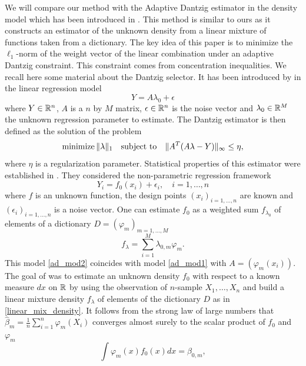 We will compare our method with the Adaptive Dantzig estimator in the density model which has been introduced in \citep{Bertin}. This method is similar to ours as it constructs an estimator of the unknown density from a linear mixture of functions taken from a dictionary. The key idea of this paper is to minimize the $\ell_1$-norm of the weight vector of the linear combination under an adaptive Dantzig constraint. This constraint comes from concentration inequalities. We recall here some material about the Dantzig selector. It has been introduced by \citep{candes2007} in the linear regression model
\begin{equation}
\label{ad_mod1}
	Y = A\lambda_0 + \epsilon
\end{equation}
where $Y\in {\mathbb R}^n$, $A$ is a $n$ by $M$ matrix, $\epsilon \in {\mathbb R}^n$ is the noise vector and $\lambda_0\in {\mathbb R}^M$ the unknown regression parameter to estimate. The Dantzig estimator is then defined as the solution of the problem
\begin{equation}
	 \textnormal{minimize}\,  \|\lambda \|_1 \quad \text{subject to} \quad \| A^T(A\lambda-Y)\|_{\infty} \leq \eta,
\end{equation}
where $\eta$ is a regularization parameter. Statistical properties of this estimator were established in \citep{bickel2009}. They considered the non-parametric regression framework
\begin{equation}
\label{ad_mod2}
		Y_i = f_0(x_i) + \epsilon_i, \quad i=1,\dots,n
\end{equation}
where $f$ is an unknown function, the design points $(x_i)_{i=1,\dots,n}$ are known and $(\epsilon_i)_{i=1,\dots,n}$ is a noise vector. One can estimate $f_0$ as a weighted sum $f_{\lambda_0}$ of elements of a dictionary $D=(\varphi_m)_{m=1,\dots,M}$
\begin{equation}
\label{linear_mix_density}
	f_{\lambda} = \sum_{i=1}^M\lambda_{0, m}\varphi_m.
\end{equation}
This model \cref{ad_mod2} coincides with model \cref{ad_mod1} with $A = (\varphi_m(x_i))$. The goal of \citep{Bertin} was to estimate an unknown density $f_0$ with respect to a known measure $dx$ on ${\mathbb R}$ by using the observation of $n$-sample $X_1,\dots,X_n$ and build a linear mixture density $f_{\lambda}$ of elements of the dictionary $D$ as in \cref{linear_mix_density}. It follows from the strong law of large numbers that $\hat\beta_m = \frac{1}{n}\sum_{i=1}^n\varphi_m(X_i)$ converges almost surely to the scalar product of $f_0$ and $\varphi_m$
\begin{equation}
      \int \varphi_m(x)f_0(x)dx=\beta_{0,m},
\end{equation}
